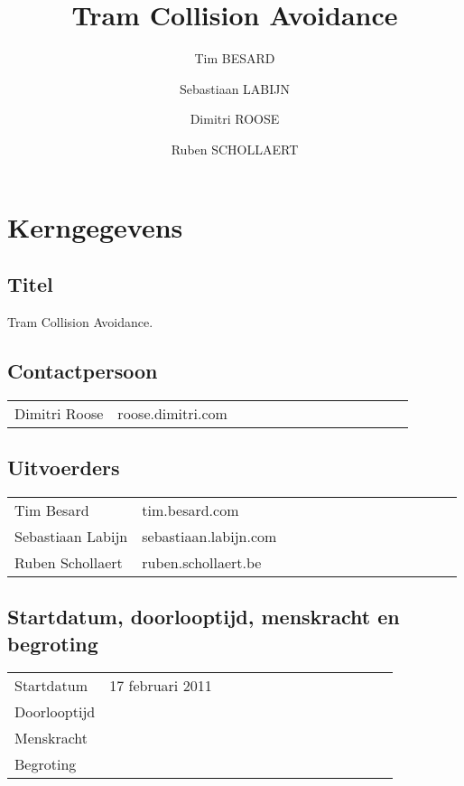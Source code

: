 \documentclass[]{book}
\begin{document}
\title{Tram Collision Avoidance}
\author{Tim BESARD \and Sebastiaan LABIJN \and Dimitri ROOSE \and Ruben SCHOLLAERT}
\date{ }
\maketitle

\section{Kerngegevens}\label{sec:kerngegevens}

\subsection{Titel}\label{sec:Titel}

Tram Collision Avoidance.

\subsection{Contactpersoon} \label{sec:Contactpersoon}

\begin{table}[h]
		\begin{tabular}{*{14}{l}}
		Dimitri Roose & roose.dimitri\@gmail.com\\
		\end{tabular}
\end{table}

\subsection{Uitvoerders}\label{sec:Uitvoerders}

\begin{table}[h]
		\begin{tabular}{*{14}{l}}
		Tim Besard & tim.besard\@gmail.com\\
		Sebastiaan Labijn & sebastiaan.labijn\@gmail.com\\
		Ruben Schollaert & ruben.schollaert\@telenet.be\\	
		\end{tabular}
\end{table}

\subsection{Startdatum, doorlooptijd, menskracht en begroting}\label{sec:Startdatum}

\begin{table}[h]
		\begin{tabular}{*{14}{l}}
		Startdatum & 17 februari 2011\\
		Doorlooptijd & \\
		Menskracht & \\	
		Begroting & \\
		\end{tabular}
\end{table}
\end{document}
